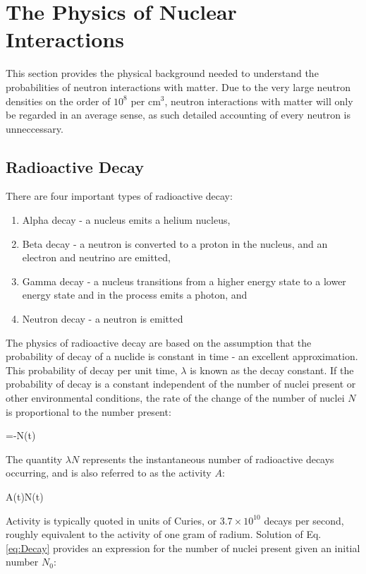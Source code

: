 \section{The Physics of Nuclear Interactions}

This section provides the physical background needed to understand the probabilities of neutron interactions with matter. Due to the very large neutron densities on the order of \(10^8\) per cm$^3$, neutron interactions with matter will only be regarded in an average sense, as such detailed accounting of every neutron is unneccessary. 

\subsection{Radioactive Decay}
\label{sec:RadioactiveDecay}
There are four important types of radioactive decay:

\begin{enumerate}
\item Alpha decay - a nucleus emits a helium nucleus,
\item Beta decay - a neutron is converted to a proton in the nucleus, and an electron and neutrino are emitted,
\item Gamma decay - a nucleus transitions from a higher energy state to a lower energy state and in the process emits a photon, and
\item Neutron decay - a neutron is emitted
\end{enumerate}

The physics of radioactive decay are based on the assumption that the probability of decay of a nuclide is constant in time - an excellent approximation. This probability of decay per unit time, \(\lambda\) is known as the decay constant. If the probability of decay is a constant independent of the number of nuclei present or other environmental conditions, the rate of the change of the number of nuclei \(N\) is proportional to the number present:

\beq
\label{eq:Decay}
=-\lambda N(t)
\eeq

The quantity \(\lambda N\) represents the instantaneous number of radioactive decays occurring, and is also referred to as the activity \(A\):

\beq
\label{eq:ActivityDef}
A(t)\equiv\lambda N(t)
\eeq

Activity is typically quoted in units of Curies, or \(3.7\times10^{10}\) decays per second, roughly equivalent to the activity of one gram of radium. Solution of Eq. \eqref{eq:Decay} provides an expression for the number of nuclei present given an initial number \(N_0\):

